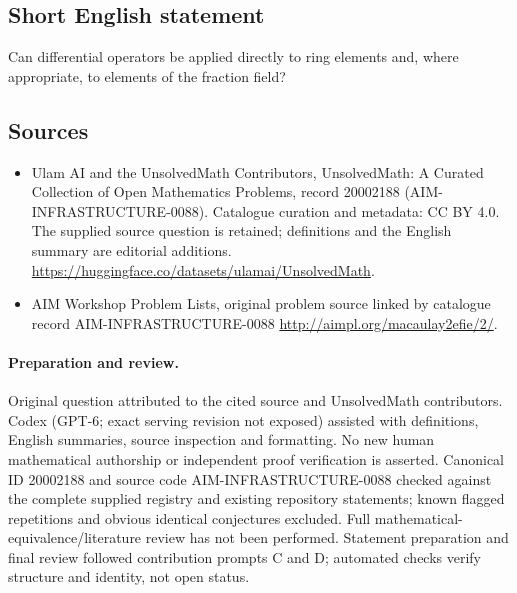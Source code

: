 \documentclass[11pt]{article}
\begin{document}
\subsection{Short English statement}
Can differential operators be applied directly to ring elements and, where appropriate, to elements of the fraction field?
\subsection{Sources}
\begin{itemize}
\item[\hypertarget{source:20002188:1}{S1}] Ulam AI and the UnsolvedMath Contributors, UnsolvedMath: A Curated Collection of Open Mathematics Problems, record 20002188 (AIM-INFRASTRUCTURE-0088). Catalogue curation and metadata: CC BY 4.0. The supplied source question is retained; definitions and the English summary are editorial additions.
\url{https://huggingface.co/datasets/ulamai/UnsolvedMath}.
\item[\hypertarget{source:20002188:2}{S2}] AIM Workshop Problem Lists, original problem source linked by catalogue record AIM-INFRASTRUCTURE-0088
\url{http://aimpl.org/macaulay2efie/2/}.
\end{itemize}
\paragraph{Preparation and review.}
Original question attributed to the cited source and UnsolvedMath contributors. Codex (GPT-6; exact serving revision not exposed) assisted with definitions, English summaries, source inspection and formatting. No new human mathematical authorship or independent proof verification is asserted. Canonical ID 20002188 and source code AIM-INFRASTRUCTURE-0088 checked against the complete supplied registry and existing repository statements; known flagged repetitions and obvious identical conjectures excluded. Full mathematical-equivalence/literature review has not been performed. Statement preparation and final review followed contribution prompts C and D; automated checks verify structure and identity, not open status.
\label{end:20002188}
\end{document}
